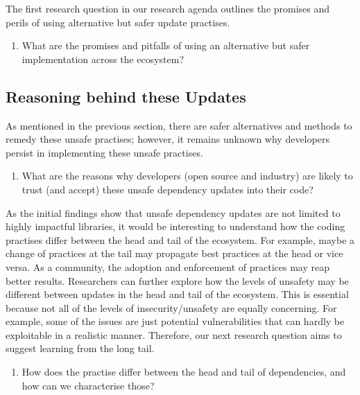 \documentclass[sigconf,screen]{acmart}
\begin{document}
\begin{sloppy}
The first research question in our research agenda outlines the promises and perils of using alternative but safer update practises.


\begin{enumerate}
 
    \item What are the promises and pitfalls of using an alternative but safer implementation across the ecosystem?

\end{enumerate}



\subsection{Reasoning behind these Updates}
As mentioned in the previous section, there are safer alternatives and methods to remedy these unsafe practises; however, it remains unknown why developers persist in implementing these unsafe practises.
\begin{enumerate}[resume]
    \item What are the reasons why developers (open source and industry) are likely to trust (and accept) these unsafe dependency updates into their code?

\end{enumerate}


As the initial findings show that unsafe dependency updates are not limited to highly impactful libraries, it would be interesting to understand how the coding practises differ between the head and tail of the ecosystem.
For example, maybe a change of practices at the tail may propagate best practices at the head or vice versa.
As a community, the adoption and enforcement of practices may reap better results.
Researchers can further explore how the levels of unsafety may be different between updates in the head and
tail of the ecosystem.
This is essential because not all of the levels of insecurity/unsafety are equally concerning.
For example, some of the issues are just potential vulnerabilities that can hardly be exploitable in a realistic manner.
Therefore, our next research question aims to suggest learning from the long tail.


\begin{enumerate}[resume]

    \item How does the practise differ between the head and tail of dependencies, and how can we characterise those? 
\end{enumerate}


\end{sloppy}
\end{document}
